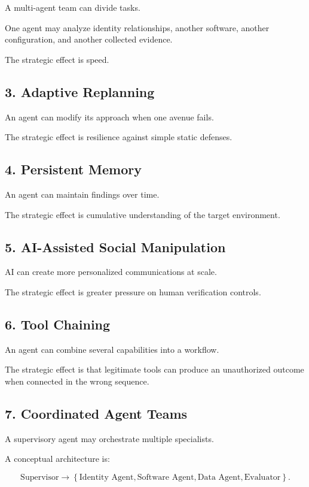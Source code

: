 A multi-agent team can divide tasks.

One agent may analyze identity relationships, another software, another configuration, and another collected evidence.

The strategic effect is speed.

\subsection{3. Adaptive Replanning}

An agent can modify its approach when one avenue fails.

The strategic effect is resilience against simple static defenses.

\subsection{4. Persistent Memory}

An agent can maintain findings over time.

The strategic effect is cumulative understanding of the target environment.

\subsection{5. AI-Assisted Social Manipulation}

AI can create more personalized communications at scale.

The strategic effect is greater pressure on human verification controls.

\subsection{6. Tool Chaining}

An agent can combine several capabilities into a workflow.

The strategic effect is that legitimate tools can produce an unauthorized outcome when connected in the wrong sequence.

\subsection{7. Coordinated Agent Teams}

A supervisory agent may orchestrate multiple specialists.

A conceptual architecture is:

\begin{equation}
\text{Supervisor}
\rightarrow
\left\{
\text{Identity Agent},
\text{Software Agent},
\text{Data Agent},
\text{Evaluator}
\right\}.
\end{equation}

